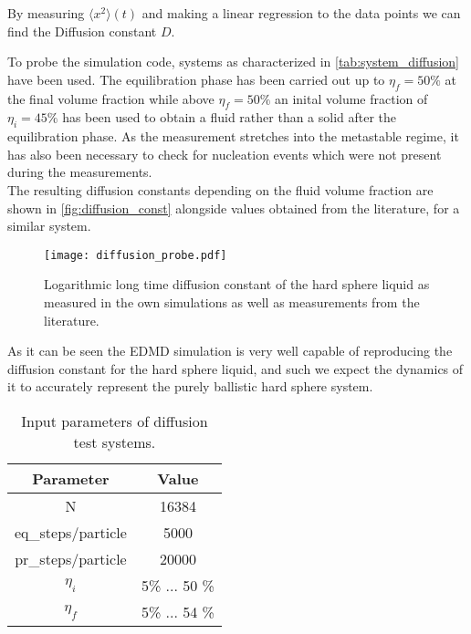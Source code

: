By measuring $\langle x^2 \rangle (t)$ and making a linear regression to the data points we can find the Diffusion constant $D$.

To probe the simulation code, systems as characterized in \autoref{tab:system_diffusion} have been used. The equilibration phase has been carried out up to $\eta_f = 50\%$ at the final volume fraction while above $\eta_f =  50\% $ an inital volume fraction of $\eta_i = 45\%$ has been used to obtain a fluid rather than a solid after the equilibration phase. As the measurement stretches into the metastable regime, it has also been necessary to check for nucleation events which were not present during the measurements.\\

The resulting diffusion constants depending on the fluid volume fraction are shown in \autoref{fig:diffusion_const} alongside values obtained from the literature, for a similar system.\\

\begin{figure}[h]
\centering
\texttt{[image: diffusion\_probe.pdf]}
\caption{Logarithmic long time diffusion constant of the hard sphere liquid as measured in the own simulations as well as measurements from the literature. }
\label{fig:diffusion_const}
\end{figure}

As it can be seen the EDMD simulation is very well capable of reproducing the diffusion constant for the hard sphere liquid, and such we expect the dynamics of it to accurately represent the purely ballistic hard sphere system.\\


\begin{table}[h]
\centering
\begin{tabular}{c|c}
Parameter & Value \\ \hline
N & 16384 \\
eq\_steps/particle & 5000 \\
pr\_steps/particle & 20000 \\
$\eta_i$ & 5\% ... 50 \% \\
$\eta_f$ & 5\% ... 54 \% \\
\end{tabular}
\caption{Input parameters of diffusion test systems.}
\label{tab:system_diffusion}
\end{table}





